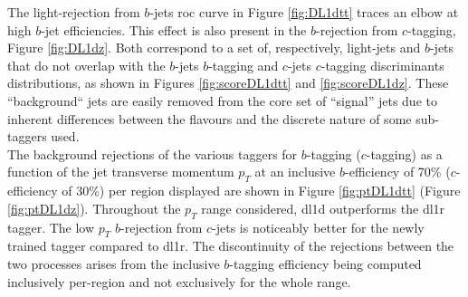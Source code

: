 The light-rejection from $b$-jets \gls{roc} curve in Figure \ref{fig:DL1dtt} traces an elbow at high $b$-jet efficiencies. This effect is also present in the $b$-rejection from $c$-tagging, Figure \ref{fig:DL1dz}. Both correspond to a set of, respectively, light-jets and $b$-jets that do not overlap with the $b$-jets $b$-tagging and $c$-jets $c$-tagging discriminants distributions, as shown in Figures \ref{fig:scoreDL1dtt} and \ref{fig:scoreDL1dz}. These ``background`` jets are easily removed from the core set of ``signal'' jets due to inherent differences between the flavours and the discrete nature of some sub-taggers used. \\

The background rejections of the various taggers for $b$-tagging ($c$-tagging) as a function of the jet transverse momentum $p_T$ at an inclusive $b$-efficiency of 70\% ($c$-efficiency of 30\%) per region displayed are shown in Figure \ref{fig:ptDL1dtt} (Figure \ref{fig:ptDL1dz}). Throughout the $p_T$ range considered, \gls{dl1d} outperforms the \gls{dl1r} tagger. The low $p_T$ $b$-rejection from $c$-jets is noticeably better for the newly trained tagger compared to \gls{dl1r}. The discontinuity of the rejections between the two processes arises from the inclusive $b$-tagging efficiency being computed inclusively per-region and not exclusively for the whole range. 

